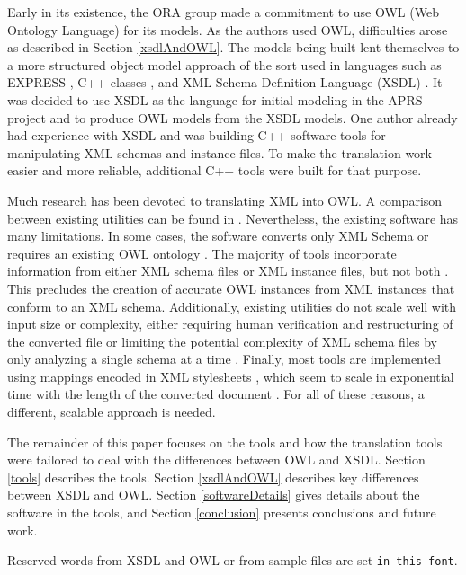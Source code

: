 \documentclass[preprint,12pt]{elsarticle}
\begin{document}
Early in its existence, the ORA group made a commitment to use OWL (Web
Ontology Language) \cite{owlPrimer,owlSpecification,protege} for its
models. As the authors used OWL, difficulties arose as described in Section
\ref{xsdlAndOWL}. The models being built lent themselves to a
more structured object model approach of the sort used in languages such as
EXPRESS \cite{express}, C++ classes \cite{c++}, and XML Schema Definition
Language (XSDL) \cite{xmlSchema0,xmlSchema1,xmlSchema2,definitive}. It was
decided to use XSDL as the language for initial modeling in the APRS
project and to produce OWL models from the XSDL models. One author
already had experience with XSDL and was building C++ software tools for
manipulating XML schemas and instance files. To make the translation work
easier and more reliable, additional C++ tools were built for that purpose.

Much research has been devoted to translating XML into OWL. A comparison
between existing utilities can be found in \cite{albarrak,bedini,yahia}.
Nevertheless, the existing software has many limitations. In some cases, the
software converts only XML Schema \cite{tsinaraki} or requires an existing
OWL ontology \cite{rodriguez}. The majority of tools incorporate
information from either XML schema files or XML instance files, but not
both \cite{bohring,garcia,ghawi}. This precludes the creation of accurate
OWL instances from XML instances that conform to an XML schema.
Additionally, existing utilities do not scale well with input size or
complexity, either requiring human verification and restructuring of the
converted file \cite{ghawi} or limiting the potential complexity of XML
schema files by only analyzing a single schema at a time \cite{garcia}.
Finally, most tools are implemented using mappings encoded in XML
stylesheets \cite{thuy,yahia,ontmalizer}, which seem to scale in
exponential time with the length of the converted document \cite{bohring}.
For all of these reasons, a different, scalable approach is needed.

The remainder of this paper focuses on the tools and how the translation
tools were tailored to deal with the differences between OWL and XSDL.
Section \ref{tools} describes the tools. Section \ref{xsdlAndOWL} describes
key differences between XSDL and OWL. Section \ref{softwareDetails} gives
details about the software in the tools, and Section \ref{conclusion}
presents conclusions and future work.

Reserved words from XSDL and OWL or from sample files are set {\tt in
  this font}.
\end{document}
